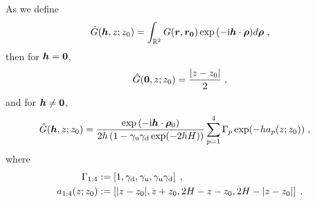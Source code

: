 \begin{thm}\label{Proposition...GreensFunction}
    As we define
    \begin{equation}
        \Hat{G}(\boldsymbol{h}, z; z_0) = \int_{\mathbb{R}^2} G(\boldsymbol{r}, \boldsymbol{r_0}) \exp{(-\mathrm{i} \boldsymbol{h} \cdot \boldsymbol{\rho})} d \bm{\rho}\;,
    \end{equation}     
then for $\boldsymbol{h}=\bm{0}$,   
\begin{equation}\label{eq...hat_G_solution...Zeroth}
        \hat{G}(\bm{0}, z; z_0) = \frac{\lvert z-z_0\rvert}{2}\;,
\end{equation}        
and for $\boldsymbol{h}\neq \bm{0}$,     
    \begin{equation}\label{eq...hat_G_solution...Non-zero}
    \begin{aligned}
\hat{G}(\V{h}, z; z_0) &=  \frac{ \exp{(-\mathrm{i} \V{h} \cdot \V{\rho}_0)}}{2 h  \left(1-\gamma_{\mrm{u}}\gamma_{\mrm{d}}\exp(-2 h H)\right)} \sum_{p=1}^4\Gamma_p\exp(- h a_p(z;z_0))\;, %
    \end{aligned}     
    \end{equation}         
where 
\begin{align*}
 \Gamma_{1:4}&:=\left[1,\gamma_{\mathrm{d}},\gamma_{\mathrm{u}},\gamma_{\mathrm{u}}\gamma_{\mathrm{d}}\right]\;,\\
 a_{1:4}(z;z_0)&:=\left[\lvert z-z_0\rvert, z+z_0,2H-z-z_0,2H-\lvert z-z_0\rvert\right]\;.
\end{align*}
\end{thm}
